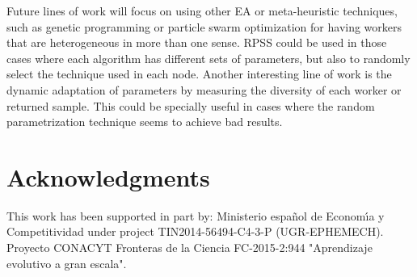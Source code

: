 \documentclass[graybox]{svmult}
\begin{document}
Future lines of work will focus on using other EA or meta-heuristic techniques,
such as genetic programming or particle swarm optimization for having
workers that are heterogeneous in more than one sense. RPSS could be
used in those cases where each algorithm has different sets of
parameters, but also to randomly select the technique used in each
node. Another interesting line of work is the dynamic adaptation of
parameters by measuring the diversity of each worker or returned
sample. This could be specially useful in cases where the random
parametrization technique seems to achieve bad results.

\section*{Acknowledgments}

This work has been supported in part by:  Ministerio espa\~{n}ol de
Econom\'{\i}a y Competitividad under project TIN2014-56494-C4-3-P
(UGR-EPHEMECH). Proyecto CONACYT Fronteras de la Ciencia FC-2015-2:944 "Aprendizaje evolutivo a gran escala".






\end{document}

